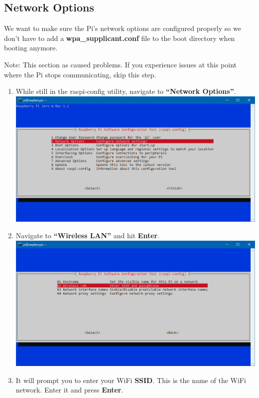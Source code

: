 \documentclass{article}
\begin{document}
\subsection{Network Options}

We want to make sure the Pi's network options are configured properly so we don't have to add a \textbf{wpa\_supplicant.conf} file to the boot directory when booting anymore.

Note: This section as caused problems. If you experience issues at this point where the Pi stops communicating, skip this step. 

\begin{enumerate}
  \item While still in the raspi-config utility, navigate to \textbf{``Network Options''}.
  \newline
  \newline
  \includegraphics[width=1.00\textwidth]{rcnet}
  \item Navigate to \textbf{``Wireless LAN''} and hit \textbf{Enter}.
  \newline
  \newline
  \includegraphics[width=1.00\textwidth]{rcnetwlan}
  \item It will prompt you to enter your WiFi \textbf{SSID}. This is the name of the WiFi network. Enter it and press \textbf{Enter}.

\end{enumerate}
\end{document}
